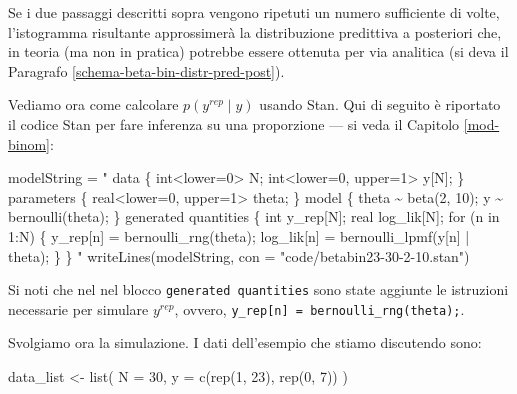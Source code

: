 \documentclass[
]{memoir}
\newenvironment{Shaded}{\begin{snugshade}}{\end{snugshade}}
\newcommand{\AttributeTok}[1]{\textcolor[rgb]{0.77,0.63,0.00}{#1}}
\newcommand{\DecValTok}[1]{\textcolor[rgb]{0.00,0.00,0.81}{#1}}
\newcommand{\FunctionTok}[1]{\textcolor[rgb]{0.00,0.00,0.00}{#1}}
\newcommand{\NormalTok}[1]{#1}
\newcommand{\OtherTok}[1]{\textcolor[rgb]{0.56,0.35,0.01}{#1}}
\newcommand{\StringTok}[1]{\textcolor[rgb]{0.31,0.60,0.02}{#1}}
\theoremstyle{definition}
\theoremstyle{definition}
\theoremstyle{definition}
\theoremstyle{definition}
\theoremstyle{remark}
\begin{document}
Se i due passaggi descritti sopra vengono ripetuti un numero sufficiente di volte, l'istogramma risultante approssimerà la distribuzione predittiva a posteriori che, in teoria (ma non in pratica) potrebbe essere ottenuta per via analitica (si deva il Paragrafo \ref{schema-beta-bin-distr-pred-post}).

Vediamo ora come calcolare \(p(y^{rep} \mid y)\) usando Stan. Qui di seguito è riportato il codice Stan per fare inferenza su una proporzione --- si veda il Capitolo \ref{mod-binom}:

\begin{Shaded}
\begin{Highlighting}[]
\NormalTok{modelString }\OtherTok{=} \StringTok{"}
\StringTok{data \{}
\StringTok{  int\textless{}lower=0\textgreater{} N;}
\StringTok{  int\textless{}lower=0, upper=1\textgreater{} y[N];}
\StringTok{\}}
\StringTok{parameters \{}
\StringTok{  real\textless{}lower=0, upper=1\textgreater{} theta;}
\StringTok{\}}
\StringTok{model \{}
\StringTok{  theta \textasciitilde{} beta(2, 10);}
\StringTok{  y \textasciitilde{} bernoulli(theta);}
\StringTok{\}}
\StringTok{generated quantities \{}
\StringTok{  int y\_rep[N];}
\StringTok{  real log\_lik[N];}
\StringTok{  for (n in 1:N) \{}
\StringTok{    y\_rep[n] = bernoulli\_rng(theta);}
\StringTok{    log\_lik[n] = bernoulli\_lpmf(y[n] | theta);}
\StringTok{  \}}
\StringTok{\}}
\StringTok{"}
\FunctionTok{writeLines}\NormalTok{(modelString, }\AttributeTok{con =} \StringTok{"code/betabin23{-}30{-}2{-}10.stan"}\NormalTok{)}
\end{Highlighting}
\end{Shaded}

Si noti che nel nel blocco \texttt{generated\ quantities} sono state aggiunte le istruzioni necessarie per simulare \(y^{rep}\), ovvero, \texttt{y\_rep{[}n{]}\ =\ bernoulli\_rng(theta);}.

Svolgiamo ora la simulazione. I dati dell'esempio che stiamo discutendo sono:

\begin{Shaded}
\begin{Highlighting}[]
\NormalTok{data\_list }\OtherTok{\textless{}{-}} \FunctionTok{list}\NormalTok{(}
  \AttributeTok{N =} \DecValTok{30}\NormalTok{,}
  \AttributeTok{y =} \FunctionTok{c}\NormalTok{(}\FunctionTok{rep}\NormalTok{(}\DecValTok{1}\NormalTok{, }\DecValTok{23}\NormalTok{), }\FunctionTok{rep}\NormalTok{(}\DecValTok{0}\NormalTok{, }\DecValTok{7}\NormalTok{))}
\NormalTok{)}
\end{Highlighting}
\end{Shaded}
\end{document}
